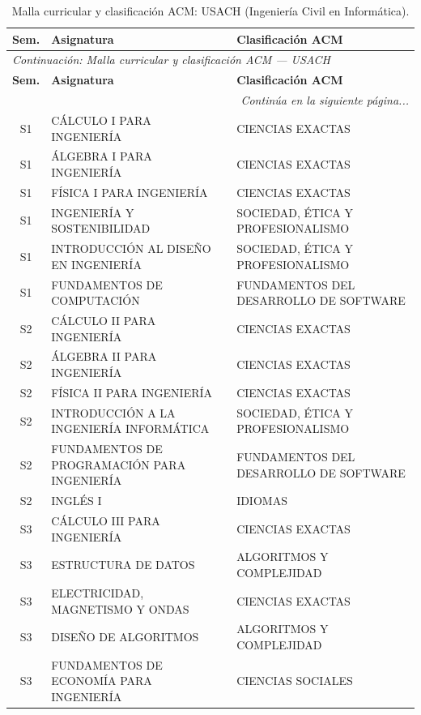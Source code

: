 \documentclass[11pt,a4paper]{article}
\begin{document}
\begin{small}
\begin{longtable}{c >{\raggedright\arraybackslash}p{8.5cm} >{\raggedright\arraybackslash}p{5.5cm}}
\caption{Malla curricular y clasificación ACM: USACH (Ingeniería Civil en Informática).} \label{tab:USACH02} \\
\toprule
\textbf{Sem.} & \textbf{Asignatura} & \textbf{Clasificación ACM} \\
\midrule
\endfirsthead
\multicolumn{3}{l}{\small\textit{Continuación: Malla curricular y clasificación ACM --- USACH}} \\[3pt]
\toprule
\textbf{Sem.} & \textbf{Asignatura} & \textbf{Clasificación ACM} \\
\midrule
\endhead
\midrule
\multicolumn{3}{r}{\small\textit{Continúa en la siguiente página...}} \\
\endfoot
\bottomrule
\endlastfoot
S1 & CÁLCULO I PARA INGENIERÍA & CIENCIAS EXACTAS \\
S1 & ÁLGEBRA I PARA INGENIERÍA & CIENCIAS EXACTAS \\
S1 & FÍSICA I PARA INGENIERÍA & CIENCIAS EXACTAS \\
S1 & INGENIERÍA Y SOSTENIBILIDAD & SOCIEDAD, ÉTICA Y PROFESIONALISMO \\
S1 & INTRODUCCIÓN AL DISEÑO EN INGENIERÍA & SOCIEDAD, ÉTICA Y PROFESIONALISMO \\
S1 & FUNDAMENTOS DE COMPUTACIÓN & FUNDAMENTOS DEL DESARROLLO DE SOFTWARE \\
S2 & CÁLCULO II PARA INGENIERÍA & CIENCIAS EXACTAS \\
S2 & ÁLGEBRA II PARA INGENIERÍA & CIENCIAS EXACTAS \\
S2 & FÍSICA II PARA INGENIERÍA & CIENCIAS EXACTAS \\
S2 & INTRODUCCIÓN A LA INGENIERÍA INFORMÁTICA & SOCIEDAD, ÉTICA Y PROFESIONALISMO \\
S2 & FUNDAMENTOS DE PROGRAMACIÓN PARA INGENIERÍA & FUNDAMENTOS DEL DESARROLLO DE SOFTWARE \\
S2 & INGLÉS I & IDIOMAS \\
S3 & CÁLCULO III PARA INGENIERÍA & CIENCIAS EXACTAS \\
S3 & ESTRUCTURA DE DATOS & ALGORITMOS Y COMPLEJIDAD \\
S3 & ELECTRICIDAD, MAGNETISMO Y ONDAS & CIENCIAS EXACTAS \\
S3 & DISEÑO DE ALGORITMOS & ALGORITMOS Y COMPLEJIDAD \\
S3 & FUNDAMENTOS DE ECONOMÍA PARA INGENIERÍA & CIENCIAS SOCIALES \\

\end{longtable}
\end{small}
\end{document}
